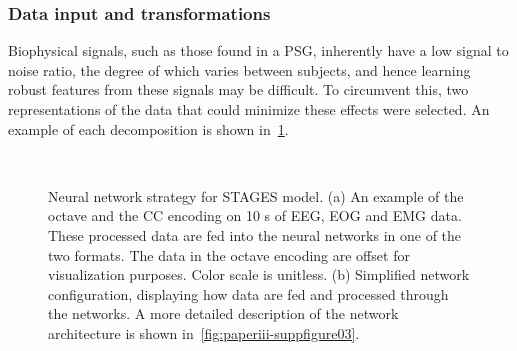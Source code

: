 \subsubsection{Data input and transformations}
Biophysical signals, such as those found in a PSG, inherently have a low signal to noise ratio, the degree of which varies between subjects, and hence learning robust features from these signals may be difficult. To circumvent this, two representations of the data that could minimize these effects were selected. An example of each decomposition is shown in~\cref{fig:paperiii-figure06}.

\begin{figure}[!tb]
    \myfloatalign   
      \\
    \caption[Neural network strategy for STAGES model]{Neural network strategy for STAGES model. (a) An example of the octave and the CC encoding on 10 s of EEG, EOG and EMG data. These processed data are fed into the neural networks in one of the two formats. The data in the octave encoding are offset for visualization purposes. Color scale is unitless. (b) Simplified network configuration, displaying how data are fed and processed through the networks. A more detailed description of the network architecture is shown in~\cref{fig:paperiii-suppfigure03}.}
    \label{fig:paperiii-figure06}
\end{figure}

